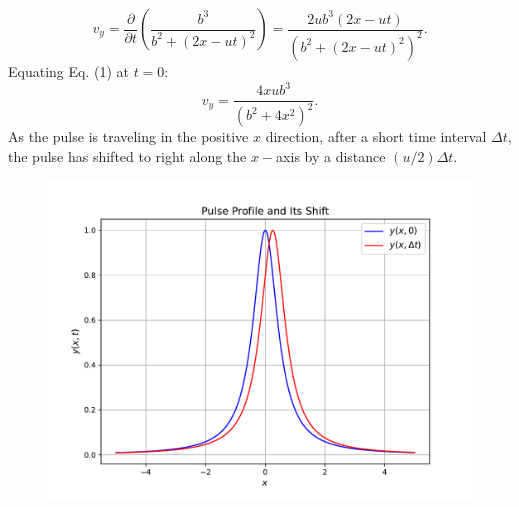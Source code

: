 \documentclass[12pt,a4paper]{article}
\begin{document}
\begin{equation}
    v_y=\frac{\partial}{\partial t}\left(\frac{b^3}{b^2+(2x-ut)^2}\right)=\frac{2ub^3(2x-ut)}{\left(b^2+\left(2x-ut\right)^2\right)^2}.
\end{equation}
Equating Eq. (1) at $t=0$:
\[v_y=\frac{4xub^3}{\left(b^2+4x^2\right)^2}.\]
As the pulse is traveling in the positive $x$ direction, after a short time interval $\Delta t$, the pulse has shifted to right along the $x-$axis by a distance $(u/2)\Delta t$.
\begin{figure}[h]
    \centering
    \includegraphics[width=0.879\linewidth]{figs/fig_sol_4.2c.pdf}
\end{figure}
\end{document}
